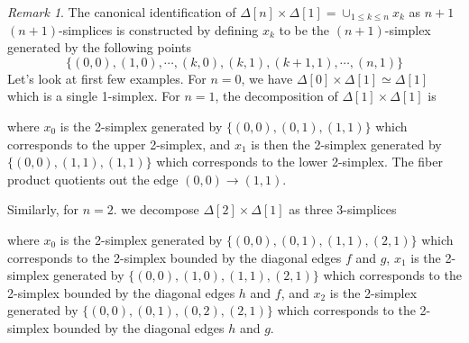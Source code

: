 \documentclass[12pt]{amsart}
\theoremstyle{definition}
\theoremstyle{remark}
\newtheorem{rem}[thm]{Remark}
\numberwithin{equation}{section}
\newcommand{\1}{{\mathbb{1}}}
\begin{document}
\begin{rem}
    The canonical identification of $\Delta[n]\times \Delta[1] = \cup_{1\le k\le n} x_k$ as $n+1$ $(n+1)$-simplices is constructed by defining $x_k$ to be the $(n+1)$-simplex generated by the following points
    $$
    \big\{(0,0), (1,0),\cdots, (k,0), (k,1), (k+1, 1),\cdots,(n,1)\big\}
    $$
    Let's look at first few examples. For $n=0$, we have $\Delta[0]\times \Delta[1]\simeq{\Delta[1]}$ which is a single 1-simplex. For $n=1$, the decomposition of $\Delta[1]\times \Delta[1]$ is 
    \begin{center}
    \end{center}
    where $x_0$ is the 2-simplex generated by $\{(0,0), (0,1), (1,1)\}$ which corresponds to the upper 2-simplex, and $x_1$ is then the 2-simplex generated by $\{(0,0), (1,1), (1,1)\}$ which corresponds to the lower 2-simplex. The fiber product quotients out the edge $(0,0)\to (1,1)$.
    
    Similarly, for $n=2$. we decompose $\Delta[2]\times \Delta[1]$ as three 3-simplices
    \begin{center}
    \end{center}
    where $x_0$ is the 2-simplex generated by $\{(0,0), (0,1), (1, 1), (2,1)\}$ which corresponds to the 2-simplex bounded by the diagonal edges $f$ and $g$, $x_1$ is the 2-simplex generated by $\{(0,0), (1,0), (1,1), (2,1)\}$ which corresponds to the 2-simplex bounded by the diagonal edges $h$ and $f$, and 
    $x_2$ is the 2-simplex generated by $\{(0,0), (0,1), (0,2), (2,1)\}$ which corresponds to the 2-simplex bounded by the diagonal edges $h$ and $g$.
\end{rem}
\end{document}
